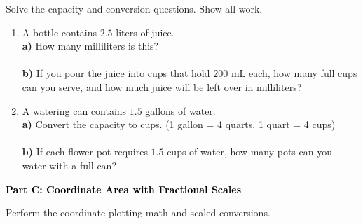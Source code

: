 \documentclass[12pt, letterpaper, fleqn]{article}
\newcommand{\blanklong}{\underline{\hspace{6.5cm}}}
\begin{document}
\vspace{3mm}

\noindent
Solve the capacity and conversion questions. Show all work.

\vspace{5mm}

\begin{enumerate}[itemsep=2.5cm, leftmargin=0.6cm]
\item A bottle contains $2.5$ liters of juice. \\
\textbf{a)} How many milliliters is this? \\
\blanklong \\
\textbf{b)} If you pour the juice into cups that hold $200$ mL each, how many full cups can you serve, and how much juice will be left over in milliliters? \\
\blanklong

\item A watering can contains $1.5$ gallons of water. \\
\textbf{a)} Convert the capacity to cups. (1 gallon = 4 quarts, 1 quart = 4 cups) \\
\blanklong \\
\textbf{b)} If each flower pot requires $1.5$ cups of water, how many pots can you water with a full can? \\
\blanklong
\end{enumerate}

\newpage

\begin{tcolorbox}[colback=black!10]
    \large\textcolor{black}{\textbf{Part C: Coordinate Area with Fractional Scales}}
\end{tcolorbox}

\vspace{3mm}

\noindent
Perform the coordinate plotting math and scaled conversions.

\vspace{5mm}
\end{document}
